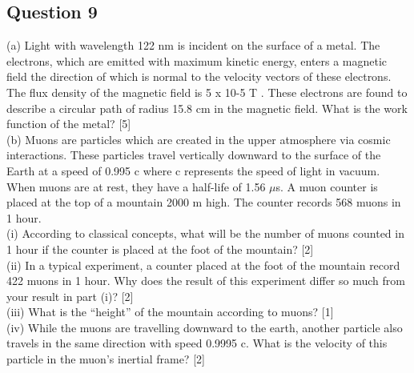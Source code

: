 \documentclass{article}
\begin{document}
\subsection{Question 9}
(a) Light with wavelength 122 nm is incident on the surface of a metal. The electrons, which are emitted with maximum kinetic energy, enters a magnetic field the direction of which is normal to the velocity vectors of these electrons. The flux density of the magnetic field is 5 x 10-5 T . These electrons are found to describe a circular path of radius 15.8 cm in the magnetic field. What is the work function of the metal? [5] \\
(b) Muons are particles which are created in the upper atmosphere via cosmic interactions. These particles travel vertically downward to the surface of the Earth at a speed of 0.995 c where c represents the speed of light in vacuum. When muons are at rest, they have a half-life of 1.56 $\mu$s. A muon counter is placed at the top of a mountain 2000 m high. The counter records 568 muons in 1 hour. \\
(i) According to classical concepts, what will be the number of muons counted in 1 hour if the counter is placed at the foot of the mountain? [2] \\
(ii) In a typical experiment, a counter placed at the foot of the mountain record 422 muons in 1 hour. Why does the result of this experiment differ so much from your result in part (i)? [2] \\
(iii) What is the “height” of the mountain according to muons? [1] \\
(iv) While the muons are travelling downward to the earth, another particle also travels in the same direction with speed 0.9995 c. What is the velocity of this particle in the muon’s inertial frame? [2]
\end{document}
